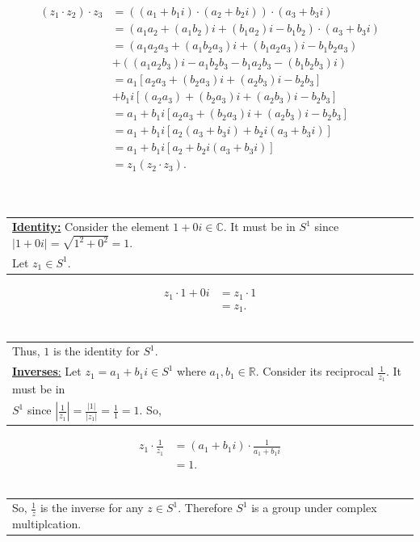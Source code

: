 \documentclass[12pt, letterpaper]{article}
\begin{document}
    \begin{align*}
        (z_1 \cdot z_2) \cdot z_3 &= ((a_1 + b_1i) \cdot (a_2 + b_2i)) \cdot (a_3 + b_3i) \\
        &= (a_1a_2 + (a_1b_2)i + (b_1a_2)i - b_1b_2) \cdot (a_3 + b_3i) \\
        &= (a_1a_2a_3 + (a_1b_2a_3)i + (b_1a_2a_3)i - b_1b_2a_3) \\
        &+ ( (a_1a_2b_3)i - a_1b_2b_3 - b_1a_2b_3 - (b_1b_2b_3)i) \\
        &= a_1[a_2a_3 + (b_2a_3)i + (a_2b_3)i - b_2b_3] \\
        &+ b_1i[(a_2a_3) + (b_2a_3)i + (a_2b_3)i - b_2b_3] \\
        &= a_1 + b_1i[a_2a_3 + (b_2a_3)i + (a_2b_3)i - b_2b_3] \\
        &= a_1 + b_1i[a_2(a_3 + b_3i) + b_2i(a_3 + b_3i)] \\
        &= a_1 + b_1i[a_2 + b_2i(a_3 + b_3i)] \\
        &= z_1(z_2 \cdot z_3).
    \end{align*} \\
    \vspace{0.5em}
    \indent \indent \ \begin{tabular}[t]{l} 
        \underline{\textbf{Identity:}} Consider the element $1 + 0i \in \mathbb{C}$. It must be in $S^1$ since $|1 + 0i| = \sqrt{1^2 + 0^2} = 1$. \\
        Let $z_1 \in S^1$.
    \end{tabular}
    \begin{align*}
        z_1 \cdot 1 + 0i &= z_1 \cdot 1 \\
        &= z_1.
    \end{align*}
   \indent \indent \ \begin{tabular}[t]{l}
     Thus, $1$ is the identity for $S^1$.  \vspace{0.5em} \\
     \underline{\textbf{Inverses}:} Let $z_1 = a_1 + b_1i \in S^1$ where $a_1, b_1 \in \mathbb{R}$. Consider its reciprocal $\frac{1}{z_1}$. It must be in \\
     $S^1$ since $|\frac{1}{z_1}| = \frac{|1|}{|z_1|} = \frac{1}{1} = 1$. So,
   \end{tabular}
   \begin{align*}
    z_1 \cdot \frac{1}{z_1} &= (a_1 + b_1i) \cdot \frac{1}{a_1 + b_1i} \\
    &= 1.
   \end{align*}
   \indent \indent \ \begin{tabular}[t]{l}
    So, $\frac{1}{z}$ is the inverse for any $z \in S^1$. Therefore $S^1$ is a group under complex multiplcation.
   \end{tabular} \hspace{0.2em} \\
\end{document}
